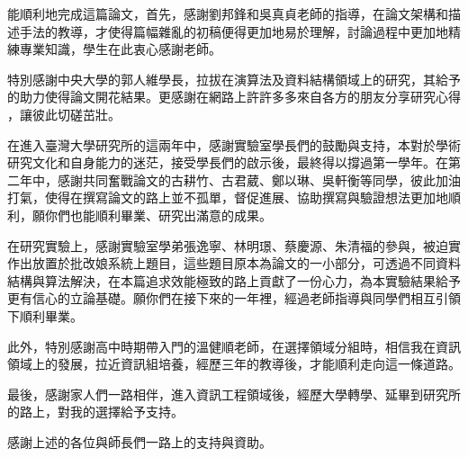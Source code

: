 \begin{acks}

能順利地完成這篇論文，首先，感謝劉邦鋒和吳真貞老師的指導，在論文架構和描
述手法的教導，才使得篇幅雜亂的初稿便得更加地易於理解，討論過程中更加地精
練專業知識，學生在此衷心感謝老師。

特別感謝中央大學的郭人維學長，拉拔在演算法及資料結構領域上的研究，其給予
的助力使得論文開花結果。更感謝在網路上許許多多來自各方的朋友分享研究心得
，讓彼此切磋茁壯。

在進入臺灣大學研究所的這兩年中，感謝實驗室學長們的鼓勵與支持，本對於學術
研究文化和自身能力的迷茫，接受學長們的啟示後，最終得以撐過第一學年。在第
二年中，感謝共同奮戰論文的古耕竹、古君葳、鄭以琳、吳軒衡等同學，彼此加油
打氣，使得在撰寫論文的路上並不孤單，督促進展、協助撰寫與驗證想法更加地順
利，願你們也能順利畢業、研究出滿意的成果。

在研究實驗上，感謝實驗室學弟張逸寧、林明璟、蔡慶源、朱清福的參與，被迫實
作出放置於批改娘系統上題目，這些題目原本為論文的一小部分，可透過不同資料
結構與算法解決，在本篇追求效能極致的路上貢獻了一份心力，為本實驗結果給予
更有信心的立論基礎。願你們在接下來的一年裡，經過老師指導與同學們相互引領
下順利畢業。

此外，特別感謝高中時期帶入門的溫健順老師，在選擇領域分組時，相信我在資訊
領域上的發展，拉近資訊組培養，經歷三年的教導後，才能順利走向這一條道路。


最後，感謝家人們一路相伴，進入資訊工程領域後，經歷大學轉學、延畢到研究所
的路上，對我的選擇給予支持。

感謝上述的各位與師長們一路上的支持與資助。

\end{acks}